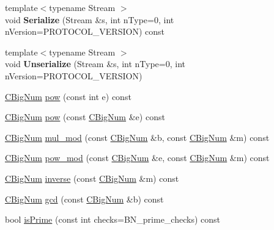 \begin{DoxyCompactItemize}
\item 
\mbox{\label{class_c_big_num_a87d4f1eaad6af2c2b3d85d43befae725}} 
{\footnotesize template$<$typename Stream $>$ }\\void {\bfseries Serialize} (Stream \&s, int n\+Type=0, int n\+Version=P\+R\+O\+T\+O\+C\+O\+L\+\_\+\+V\+E\+R\+S\+I\+ON) const
\item 
\mbox{\label{class_c_big_num_aa70f21429cc04c2dbee78189c454bac2}} 
{\footnotesize template$<$typename Stream $>$ }\\void {\bfseries Unserialize} (Stream \&s, int n\+Type=0, int n\+Version=P\+R\+O\+T\+O\+C\+O\+L\+\_\+\+V\+E\+R\+S\+I\+ON)
\item 
\mbox{\hyperlink{class_c_big_num}{C\+Big\+Num}} \mbox{\hyperlink{class_c_big_num_aa8c79c0a8ca34ed34ef315047137ecc7}{pow}} (const int e) const
\item 
\mbox{\hyperlink{class_c_big_num}{C\+Big\+Num}} \mbox{\hyperlink{class_c_big_num_ad78d76fa6b5f7faad3b3966e22f3832e}{pow}} (const \mbox{\hyperlink{class_c_big_num}{C\+Big\+Num}} \&e) const
\item 
\mbox{\hyperlink{class_c_big_num}{C\+Big\+Num}} \mbox{\hyperlink{class_c_big_num_abf7973e872561306532d90386d325875}{mul\+\_\+mod}} (const \mbox{\hyperlink{class_c_big_num}{C\+Big\+Num}} \&b, const \mbox{\hyperlink{class_c_big_num}{C\+Big\+Num}} \&m) const
\item 
\mbox{\hyperlink{class_c_big_num}{C\+Big\+Num}} \mbox{\hyperlink{class_c_big_num_a949004e3f63921b28b4e245624854289}{pow\+\_\+mod}} (const \mbox{\hyperlink{class_c_big_num}{C\+Big\+Num}} \&e, const \mbox{\hyperlink{class_c_big_num}{C\+Big\+Num}} \&m) const
\item 
\mbox{\hyperlink{class_c_big_num}{C\+Big\+Num}} \mbox{\hyperlink{class_c_big_num_ace6cb4447751b27f00139d60dd8ebba4}{inverse}} (const \mbox{\hyperlink{class_c_big_num}{C\+Big\+Num}} \&m) const
\item 
\mbox{\hyperlink{class_c_big_num}{C\+Big\+Num}} \mbox{\hyperlink{class_c_big_num_a404a5797d26614e7854947e00d286d36}{gcd}} (const \mbox{\hyperlink{class_c_big_num}{C\+Big\+Num}} \&b) const
\item 
bool \mbox{\hyperlink{class_c_big_num_a6d51387c37d74d3c9dfe4fc7aa8affce}{is\+Prime}} (const int checks=B\+N\+\_\+prime\+\_\+checks) const
\item 
\mbox{\label{class_c_big_num_a0e237d40f4ea66b930b8136f77fd1349}} 

\end{DoxyCompactItemize}
